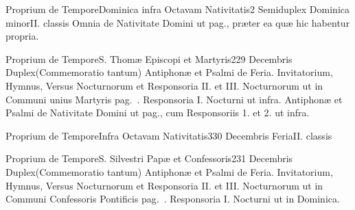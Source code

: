 \documentclass[nocturnale-romanum.tex]{subfiles}
\begin{document}
	{Proprium de Tempore}{Dominica infra Octavam Nativitatis}{2}{}
	{Semiduplex Dominica minor}{II. classis}
	{Omnia de Nativitate Domini ut pag.\pageref{M-1225}, præter ea quæ hic habentur propria.}
	{}


\tedeumrubric

	{Proprium de Tempore}{S. Thomæ Episcopi et Martyris}{2}{29 Decembris}
	{Duplex}{(Commemoratio tantum)}
	{Antiphonæ et Psalmi de Feria. Invitatorium, Hymnus, Versus Nocturnorum et Responsoria II. et III. Nocturnorum ut in Communi unius Martyris pag.\ \pageref{M-UMEX}. Responsoria I. Nocturni ut infra.}
	{Antiphonæ et Psalmi de Nativitate Domini ut pag.\pageref{M-1225}, cum Responsoriis 1. et 2. ut infra.}
	

	{Proprium de Tempore}{Infra Octavam Nativitatis}{3}{30 Decembris}
	{Feria}{II. classis}
	{}
	{}
\tedeumrubric

	{Proprium de Tempore}{S. Silvestri Papæ et Confessoris}{2}{31 Decembris}
	{Duplex}{(Commemoratio tantum)}
	{Antiphonæ et Psalmi de Feria. Invitatorium, Hymnus, Versus Nocturnorum et Responsoria II. et III. Nocturnorum ut in Communi Confessoris Pontificis pag.\ \pageref{M-COPO}. Responsoria I. Nocturni ut in Dominica.}
	{}
\end{document}
